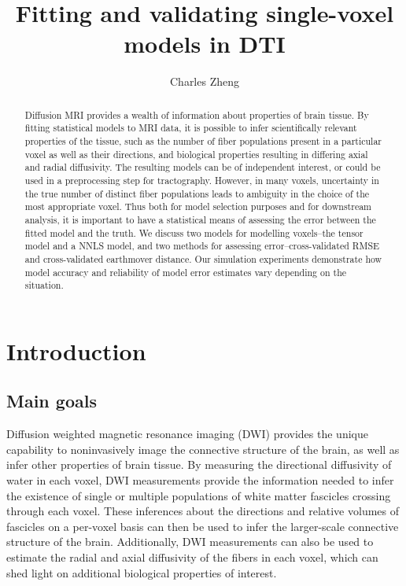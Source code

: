 \documentclass[11pt]{article}
\begin{document}
\newcommand{\tr}{\text{tr}}
\newcommand{\E}{\textbf{E}}
\newcommand{\diag}{\text{diag}}
\newcommand{\argmax}{\text{argmax}}
\newcommand{\Cov}{\text{Cov}}
\pagestyle{fancy}

\title{Fitting and validating single-voxel models in DTI}

\author{Charles Zheng}

\maketitle

\begin{abstract}
Diffusion MRI provides a wealth of information about properties of
brain tissue.  By fitting statistical models to MRI data, it is
possible to infer scientifically relevant properties of the tissue,
such as the number of fiber populations present in a particular voxel
as well as their directions, and biological properties resulting in
differing axial and radial diffusivity.  The resulting models can be
of independent interest, or could be used in a preprocessing step for
tractography.  However, in many voxels, uncertainty in
the true number of distinct fiber populations leads to ambiguity in
the choice of the most appropriate voxel.
Thus both for model selection purposes and for downstream analysis,
it is important to have a statistical means of assessing the
error between the fitted model and the truth.  We discuss two models
for modelling voxels--the tensor model and a NNLS model, and two
methods for assessing error--cross-validated RMSE and cross-validated
earthmover distance.  Our simulation experiments demonstrate how model
accuracy and reliability of model error estimates vary depending on
the situation.
\end{abstract}

\section{Introduction}

\subsection{Main goals}

Diffusion weighted magnetic resonance imaging (DWI) provides the
unique capability to noninvasively image the connective structure of
the brain, as well as infer other properties of brain tissue.
By measuring the directional diffusivity of water in each voxel, DWI
measurements provide the information needed to infer the existence of
single or multiple populations of white matter fascicles crossing
through each voxel.
These inferences about the directions and relative volumes of
fascicles on a per-voxel basis can then be used to infer the
larger-scale connective structure of the brain.
Additionally, DWI measurements can also be used to estimate the radial
and axial diffusivity of the fibers in each voxel, which can shed
light on additional biological properties of interest.\cite{Rokem2013}
\cite{Pestilli2013}\cite{Behrens2009}
\end{document}
